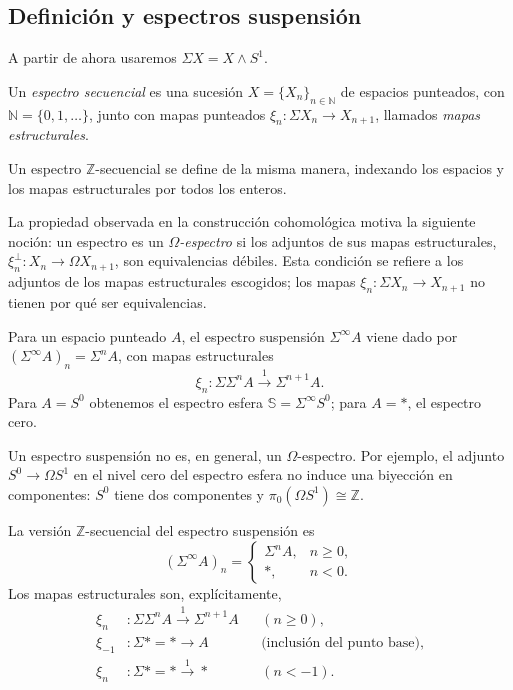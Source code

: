 \subsection{Definición y espectros suspensión}

A partir de ahora usaremos $\Sigma X=X\wedge S^1$.

\begin{defi}\label{defi:espectro-secuencial}
Un \emph{espectro secuencial} es una sucesión $X=\{X_n\}_{n\in\mathbb N}$ de espacios punteados, con $\mathbb N=\{0,1,\ldots\}$, junto con mapas punteados $\xi_n\colon\Sigma X_n\to X_{n+1}$, llamados \emph{mapas estructurales}.
\end{defi}

\begin{defi}\label{defi:espectro-z}
Un espectro $\mathbb Z$-secuencial se define de la misma manera, indexando los espacios y los mapas estructurales por todos los enteros.
\end{defi}

\begin{nota}
La propiedad observada en la construcción cohomológica motiva la siguiente noción: un espectro es un \emph{$\Omega$-espectro} si los adjuntos de sus mapas estructurales, $\xi_n^\perp\colon X_n\to\Omega X_{n+1}$, son equivalencias débiles. Esta condición se refiere a los adjuntos de los mapas estructurales escogidos; los mapas $\xi_n\colon\Sigma X_n\to X_{n+1}$ no tienen por qué ser equivalencias.
\end{nota}

\begin{ejem}\label{ejem:suspension-espectro}
Para un espacio punteado $A$, el espectro suspensión $\Sigma^\infty A$ viene dado por $(\Sigma^\infty A)_n=\Sigma^nA$, con mapas estructurales
\[
\xi_n\colon\Sigma\Sigma^nA\xrightarrow{1}\Sigma^{n+1}A.
\]
Para $A=S^0$ obtenemos el espectro esfera $\mathbb S=\Sigma^\infty S^0$; para $A=*$, el espectro cero.
\end{ejem}

\begin{nota}
Un espectro suspensión no es, en general, un $\Omega$-espectro. Por ejemplo, el adjunto $S^0\to\Omega S^1$ en el nivel cero del espectro esfera no induce una biyección en componentes: $S^0$ tiene dos componentes y $\pi_0(\Omega S^1)\cong\mathbb Z$.
\end{nota}

\begin{ejem}\label{ejem:espectro-z-secuencial}
La versión $\mathbb Z$-secuencial del espectro suspensión es
\[
(\Sigma^\infty A)_n=
\begin{cases}
\Sigma^nA,&n\ge0,\\
*,&n<0.
\end{cases}
\]
Los mapas estructurales son, explícitamente,
\[
\begin{aligned}
\xi_n&\colon\Sigma\Sigma^nA\xrightarrow{1}\Sigma^{n+1}A &&(n\ge0),\\
\xi_{-1}&\colon\Sigma*=*\longrightarrow A &&\text{(inclusión del punto base)},\\
\xi_n&\colon\Sigma*=*\xrightarrow{1}* &&(n<-1).
\end{aligned}
\]
\end{ejem}

